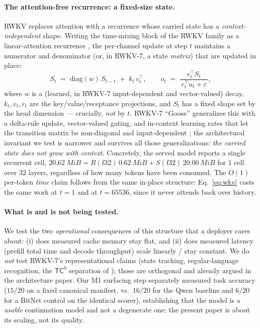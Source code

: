 \documentclass[11pt,a4paper]{article}
\begin{document}
\paragraph{The attention-free recurrence: a fixed-size state.}
RWKV replaces attention with a recurrence whose carried state has a
\emph{context-independent} shape. Writing the time-mixing block of the RWKV
family as a linear-attention recurrence \citep{katharopoulos2020transformers,
peng2023rwkv}, the per-channel update at step \(t\) maintains a numerator and
denominator (or, in RWKV-7, a state \emph{matrix}) that are updated in place:
\begin{equation}
\label{eq:wkv}
S_t \;=\; \mathrm{diag}(w)\, S_{t-1} \;+\; k_t\, v_t^{\top},
\qquad
o_t \;=\; \frac{r_t^{\top} S_t}{\,r_t^{\top} u_t + \varepsilon\,},
\end{equation}
where \(w\) is a (learned, in RWKV-7 input-dependent and vector-valued) decay,
\(k_t, v_t, r_t\) are the key/value/receptance projections, and \(S_t\) has a
fixed shape set by the head dimension --- crucially, \emph{not} by \(t\).
RWKV-7 ``Goose'' generalizes this with a delta-rule update, vector-valued gating,
and in-context learning rates that let the transition matrix be non-diagonal and
input-dependent \citep{peng2025rwkv7}; the architectural invariant we test is
narrower and survives all those generalizations: \emph{the carried state does not
grow with context}. Concretely, the served model reports a single recurrent cell,
\(\SI{20.62}{MiB} = R(\mathrm{f32})\,\SI{0.62}{MiB} + S(\mathrm{f32})\,\SI{20.00}{MiB}\)
for \(1\) cell over \(32\) layers, regardless of how many tokens have been
consumed. The \(O(1)\) per-token \emph{time} claim follows from the same
in-place structure: Eq.~\eqref{eq:wkv} costs the same work at \(t=1\) and at
\(t=\num{65536}\), since it never attends back over history.

\paragraph{What is and is not being tested.}
We test the two \emph{operational} consequences of this structure that a
deployer cares about: (i) does measured cache memory stay flat, and (ii) does
measured latency (prefill total time and decode throughput) scale linearly /
stay constant. We do \emph{not} test RWKV-7's representational claims (state
tracking, regular-language recognition, the \(\mathsf{TC}^0\) separation of
\citealp{peng2025rwkv7}); those are orthogonal and already argued in the
architecture paper. Our M1 surfacing step separately measured task accuracy
(\(15/20\) on a fixed canonical manifest, vs.\ \(16/20\) for the Qwen baseline
and \(6/20\) for a BitNet control on the identical scorer), establishing that
the model is a \emph{usable} continuation model and not a degenerate one; the
present paper is about its scaling, not its quality.
\end{document}
